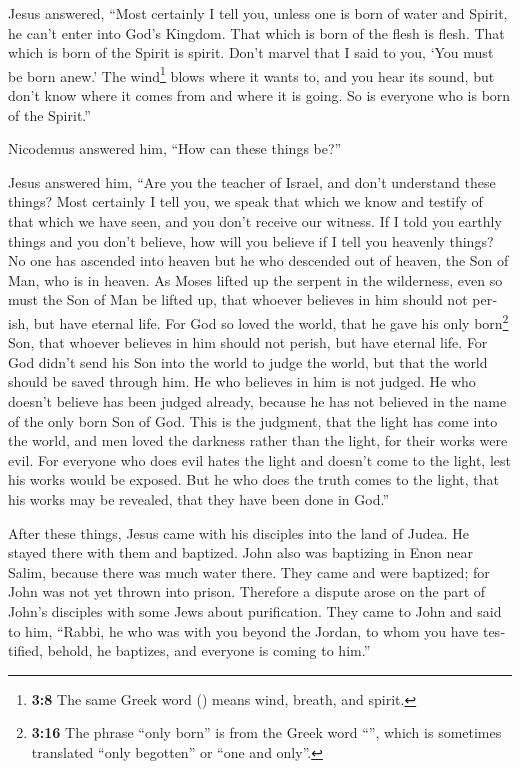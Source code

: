\begin{paracol}{2}
\begin{otherlanguage}{english}
 Jesus answered, ``Most certainly I tell you, unless one
is born of water and Spirit, he can't enter into God's Kingdom.
 That which is born of the flesh is flesh. That which is
born of the Spirit is spirit.  Don't marvel that I said to
you, `You must be born anew.'  The wind\footnote{\textbf{3:8}
  The same Greek word () means wind, breath, and spirit.}
blows where it wants to, and you hear its sound, but don't know where it
comes from and where it is going. So is everyone who is born of the
Spirit.''

 Nicodemus answered him, ``How can these things be?''

 Jesus answered him, ``Are you the teacher of Israel, and
don't understand these things?  Most certainly I tell
you, we speak that which we know and testify of that which we have seen,
and you don't receive our witness.  If I told you earthly
things and you don't believe, how will you believe if I tell you
heavenly things?  No one has ascended into heaven but he
who descended out of heaven, the Son of Man, who is in heaven.
 As Moses lifted up the serpent in the wilderness, even
so must the Son of Man be lifted up,  that whoever
believes in him should not perish, but have eternal life.
 For God so loved the world, that he gave his only
born\footnote{\textbf{3:16} The phrase ``only born'' is from the Greek
  word ``'', which is sometimes translated ``only
  begotten'' or ``one and only''.} Son, that whoever believes in him
should not perish, but have eternal life.  For God didn't
send his Son into the world to judge the world, but that the world
should be saved through him.  He who believes in him is
not judged. He who doesn't believe has been judged already, because he
has not believed in the name of the only born Son of God.
 This is the judgment, that the light has come into the
world, and men loved the darkness rather than the light, for their works
were evil.  For everyone who does evil hates the light
and doesn't come to the light, lest his works would be exposed.
 But he who does the truth comes to the light, that his
works may be revealed, that they have been done in God.''

 After these things, Jesus came with his disciples into
the land of Judea. He stayed there with them and baptized.
 John also was baptizing in Enon near Salim, because
there was much water there. They came and were baptized; 
for John was not yet thrown into prison.  Therefore a
dispute arose on the part of John's disciples with some Jews about
purification.  They came to John and said to him,
``Rabbi, he who was with you beyond the Jordan, to whom you have
testified, behold, he baptizes, and everyone is coming to him.''


\end{otherlanguage}
\end{paracol}
